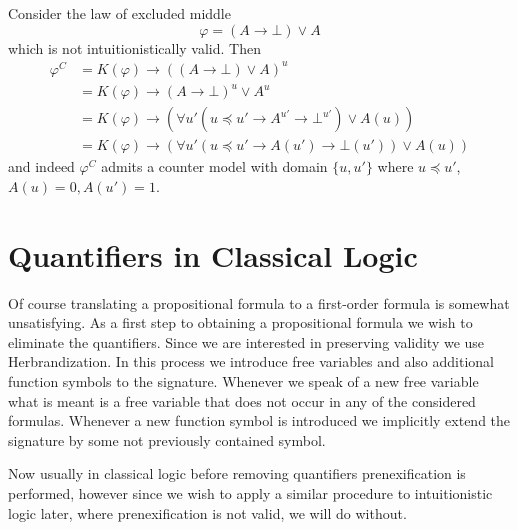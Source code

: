 \documentclass[a4paper,UKenglish,cleveref, autoref, thm-restate]{lipics-v2021}
\begin{document}
\begin{example}
	Consider the law of excluded middle $$\varphi = (A\to \bot)\vee A$$ which is not intuitionistically valid. Then
	\begin{align*}
		\varphi^{C} &= K(\varphi)\to ((A\to \bot)\vee A)^u\\
		&= K(\varphi)\to (A\to \bot)^u\vee A^u\\
		&= K(\varphi)\to (\forall u'( u\preceq u' \to A^{u'}\to \bot^{u'})\vee A(u))\\
		&= K(\varphi)\to (\forall u' (u\preceq u' \to A(u')\to \bot(u'))\vee A(u))
	\end{align*}
	and indeed $\varphi^{C}$ admits a counter model with domain $\{u, u'\}$ where $u \preceq u'$, $A(u) = 0, A(u') = 1$.
\end{example}



\section{Quantifiers in Classical Logic}

Of course translating a propositional formula to a first-order formula is somewhat unsatisfying. As a first step to obtaining a propositional formula we wish to eliminate the quantifiers. Since we are interested in preserving validity we use Herbrandization. In this process we introduce free variables and also additional function symbols to the signature. Whenever we speak of a new free variable what is meant is a free variable that does not occur in any of the considered formulas. Whenever a new function symbol is introduced we implicitly extend the signature by some not previously contained symbol.

Now usually in classical logic before removing quantifiers prenexification is performed, however since we wish to apply a similar procedure to intuitionistic logic later, where prenexification is not valid, we will do without.
\end{document}
